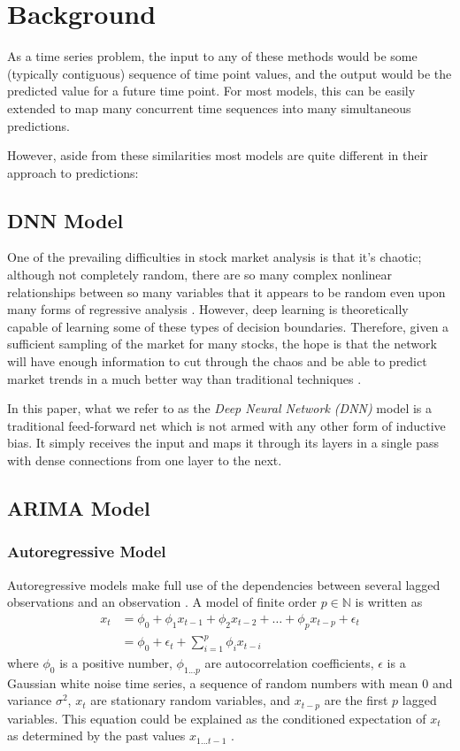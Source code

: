 \documentclass[conference]{IEEEtran}
\begin{document}
\section{Background}

As a time series problem, the input to any of these methods would be some (typically contiguous) sequence of time point values, and the output would be the predicted value for a future time point.
For most models, this can be easily extended to map many concurrent time sequences into many simultaneous predictions.

However, aside from these similarities most models are quite different in their approach to predictions:

\subsection{DNN Model}
One of the prevailing difficulties in stock market analysis is that it's chaotic; although not completely random, there are so many complex nonlinear relationships between so many variables that it appears to be random even upon many forms of regressive analysis \cite{lawrence}.
However, deep learning is theoretically capable of learning some of these types of decision boundaries.
Therefore, given a sufficient sampling of the market for many stocks, the hope is that the network will have enough information to cut through the chaos and be able to predict market trends in a much better way than traditional techniques \cite{lawrence}.

In this paper, what we refer to as the \textit{Deep Neural Network (DNN)} model is a traditional feed-forward net which is not armed with any other form of inductive bias.
It simply receives the input and maps it through its layers in a single pass with dense connections from one layer to the next.

\subsection{ARIMA Model}
\subsubsection{Autoregressive Model}
Autoregressive models make full use of the dependencies between several lagged observations and an observation \cite{tsay, pesaran2015time}.
A model of finite order $p \in \mathbb{N}$ is written as
\begin{align}
    x_t &= \phi_0 + \phi_1 x_{t-1} + \phi_2 x_{t-2} + \dots + \phi_p x_{t-p} + \epsilon_t \\
    &= \phi_0 + \epsilon_t + \sum_{i=1}^p{\phi_i x_{t-i}}
\end{align}
where $\phi_0$ is a positive number, $\phi_{1...p}$ are autocorrelation coefficients, $\epsilon$ is a Gaussian white noise time series, a sequence of random numbers with mean 0 and variance $\sigma^2$, $x_t$ are stationary random variables, and $x_{t-p}$ are the first $p$ lagged variables.
This equation could be explained as the conditioned expectation of $x_{t}$ as determined by the past values $x_{1...t-1}$ \cite{tsay}.
\end{document}
